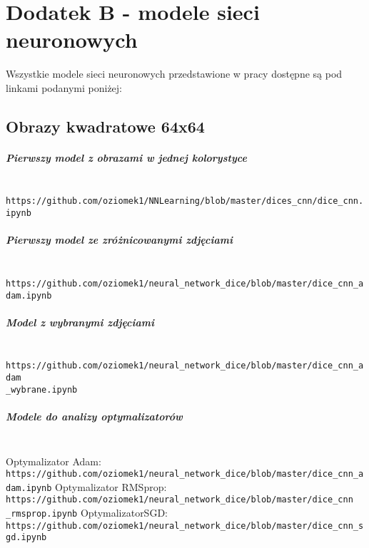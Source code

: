 
\chapter{Dodatek B - modele sieci neuronowych} \label{dodatekB}

Wszystkie modele sieci neuronowych przedstawione w pracy dostępne są pod linkami
podanymi poniżej:
\section{Obrazy kwadratowe 64x64}
\paragraph{Pierwszy model z obrazami w jednej kolorystyce} \mbox{}\\
\texttt{https://github.com/oziomek1/NNLearning/blob/master/dices\_cnn/dice\_cnn.ipynb}

\paragraph{Pierwszy model ze zróżnicowanymi zdjęciami} \mbox{}\\
\texttt{https://github.com/oziomek1/neural\_network\_dice/blob/master/dice\_cnn\_adam.ipynb}

\paragraph{Model z wybranymi zdjęciami} \mbox{}\\
\texttt{https://github.com/oziomek1/neural\_network\_dice/blob/master/dice\_cnn\_adam\\\_wybrane.ipynb}

\paragraph{Modele do analizy optymalizatorów} \mbox{}\\
Optymalizator Adam:\\
\texttt{https://github.com/oziomek1/neural\_network\_dice/blob/master/dice\_cnn\_adam.ipynb}
Optymalizator RMSprop:\\
\texttt{https://github.com/oziomek1/neural\_network\_dice/blob/master/dice\_cnn\\\_rmsprop.ipynb}
OptymalizatorSGD:\\
\texttt{https://github.com/oziomek1/neural\_network\_dice/blob/master/dice\_cnn\_sgd.ipynb}

